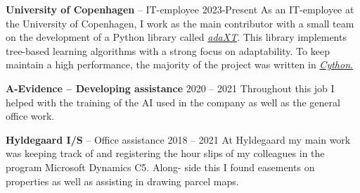 \resumeSubHeadingListStart

\resumeProjectHeading
{\textbf{University of Copenhagen} -- IT-employee \vspace{8pt}}{2023-Present}
\small{
	As an IT-employee at the University of Copenhagen, I work as the main
	contributor with a small team on the development of a Python library called
	\href{https://github.com/NiklasPfister/adaXT}{\emph{adaXT}}. This library
	implements tree-based learning algorithms with a strong focus on
	adaptability. To keep maintain a high performance, the majority of the
	project was written in \href{https://cython.org/}{\emph{Cython}.}
}

\resumeProjectHeading
{\textbf{A-Evidence -- Developing assistance} \vspace{8pt}}{2020 -- 2021}
\small{Throughout this job I helped with the training of the AI used in the
	company as well as the general office work.}

\resumeProjectHeading
{\textbf{Hyldegaard I/S} -- Office assistance \vspace{8pt}}{2018 -- 2021}
\small{At Hyldegaard my main work was keeping track of and registering the
	hour slips of my colleagues in the program Microsoft Dynamics C5. Along-
	side this I found easements on properties as well as assisting in drawing
	parcel maps.}

\resumeSubHeadingListEnd
